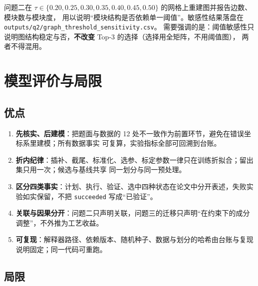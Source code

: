 \documentclass[
  a4paper,12pt]{article}
\providecommand{\tightlist}{%
  \setlength{\itemsep}{0pt}\setlength{\parskip}{0pt}}
\begin{document}
问题二在 \(\tau\in\{0.20,0.25,0.30,0.35,0.40,0.45,0.50\}\)
的网格上重建图并报告边数、模块数与模块度，
用以说明``模块结构是否依赖单一阈值''。敏感性结果落盘在
\texttt{outputs/q2/graph\_threshold\_sensitivity.csv}。
需要强调的是：阈值敏感性只说明图结构稳定与否，\textbf{不改变} Top-3
的选择（选择用全矩阵，不用阈值图）， 两者不得混用。

\section{模型评价与局限}\label{ux6a21ux578bux8bc4ux4ef7ux4e0eux5c40ux9650}

\subsection{优点}\label{ux4f18ux70b9}

\begin{enumerate}
\def\labelenumi{\arabic{enumi}.}
\tightlist
\item
  \textbf{先核实、后建模}：把题面与数据的 12
  处不一致作为前置环节，避免在错误坐标系里建模；所有数据事实
  可复算，实验指标全部可回溯到台账。
\item
  \textbf{折内纪律}：插补、截尾、标准化、选参、标定参数一律只在训练折拟合；留出集只用一次；候选与基线共享
  同一划分与同一预处理。
\item
  \textbf{区分四类事实}：计划、执行、验证、选中四种状态在论文中分开表述，失败实验如实保留，不把
  \texttt{succeeded} 写成``已验证''。
\item
  \textbf{关联与因果分开}：问题二只声明关联，问题三的迁移只声明``在约束下的成分调整''，不外推为工艺收益。
\item
  \textbf{可复现}：解释器路径、依赖版本、随机种子、数据与划分的哈希由台账与复现说明固定；同一代码可重跑。
\end{enumerate}

\subsection{局限}\label{ux5c40ux9650}
\end{document}
